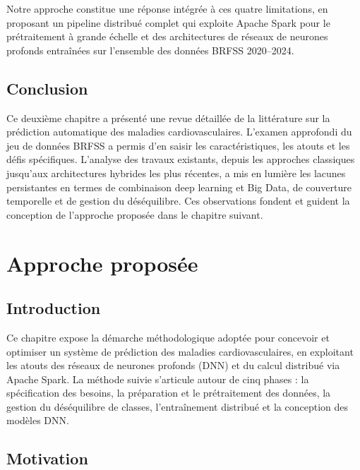 \documentclass[12pt,a4paper]{report}
\begin{document}
Notre approche constitue une réponse intégrée à ces quatre limitations, en proposant
un pipeline distribué complet qui exploite Apache Spark pour le prétraitement à grande
échelle et des architectures de réseaux de neurones profonds entraînées sur l'ensemble
des données \acs{BRFSS} 2020--2024.

\section*{Conclusion}

Ce deuxième chapitre a présenté une revue détaillée de la littérature sur la
prédiction automatique des maladies cardiovasculaires. L'examen approfondi du jeu de
données \acs{BRFSS} a permis d'en saisir les caractéristiques, les atouts et les défis
spécifiques. L'analyse des travaux existants, depuis les approches classiques jusqu'aux
architectures hybrides les plus récentes, a mis en lumière les lacunes persistantes en
termes de combinaison deep learning et Big Data, de couverture temporelle et de gestion
du déséquilibre. Ces observations fondent et guident la conception de l'approche
proposée dans le chapitre suivant.

\chapter{Approche proposée}


\section*{Introduction}

Ce chapitre expose la démarche méthodologique adoptée pour concevoir et optimiser
un système de prédiction des maladies cardiovasculaires, en exploitant les atouts
des réseaux de neurones profonds (\acs{DNN}) et du calcul distribué via Apache Spark.
La méthode suivie s'articule autour de cinq phases : la spécification des besoins,
la préparation et le prétraitement des données, la gestion du déséquilibre de classes,
l'entraînement distribué et la conception des modèles \acs{DNN}.

\section{Motivation}
\end{document}
